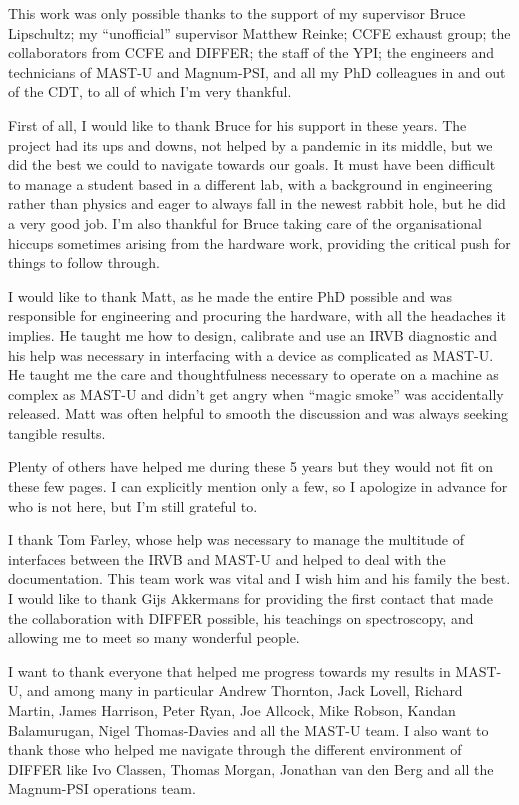 \documentclass[]{yorkThesis}  %
\begin{document}
\acknowledgments
{}


This work was only possible thanks to the support of my supervisor Bruce Lipschultz; my ``unofficial'' supervisor Matthew Reinke; CCFE exhaust group; the collaborators from CCFE and DIFFER; the staff of the YPI; the engineers and technicians of MAST-U and Magnum-PSI, and all my PhD colleagues in and out of the CDT, to all of which I'm very thankful.

First of all, I would like to thank Bruce for his support in these years. The project had its ups and downs, not helped by a pandemic in its middle, but we did the best we could to navigate towards our goals. It must have been difficult to manage a student based in a different lab, with a background in engineering rather than physics and eager to always fall in the newest rabbit hole, but he did a very good job. I'm also thankful for Bruce taking care of the organisational hiccups sometimes arising from the hardware work, providing the critical push for things to follow through.

I would like to thank Matt, as he made the entire PhD possible and was responsible for engineering and procuring the hardware, with all the headaches it implies. He taught me how to design, calibrate and use an IRVB diagnostic and his help was necessary in interfacing with a device as complicated as MAST-U. He taught me the care and thoughtfulness necessary to operate on a machine as complex as MAST-U and didn't get angry when ``magic smoke'' was accidentally released. Matt was often helpful to smooth the discussion and was always seeking tangible results.

Plenty of others have helped me during these 5 years but they would not fit on these few pages. I can explicitly mention only a few, so I apologize in advance for who is not here, but I'm still grateful to.

I thank Tom Farley, whose help was necessary to manage the multitude of interfaces between the IRVB and MAST-U and helped to deal with the documentation. This team work was vital and I wish him and his family the best. I would like to thank Gijs Akkermans for providing the first contact that made the collaboration with DIFFER possible, his teachings on spectroscopy, and allowing me to meet so many wonderful people.

I want to thank everyone that helped me progress towards my results in MAST-U, and among many in particular Andrew Thornton, Jack Lovell, Richard Martin, James Harrison, Peter Ryan, Joe Allcock, Mike Robson, Kandan Balamurugan, Nigel Thomas-Davies and all the MAST-U team. I also want to thank those who helped me navigate through the different environment of DIFFER like Ivo Classen, Thomas Morgan, Jonathan van den Berg and all the Magnum-PSI operations team.
\end{document}
